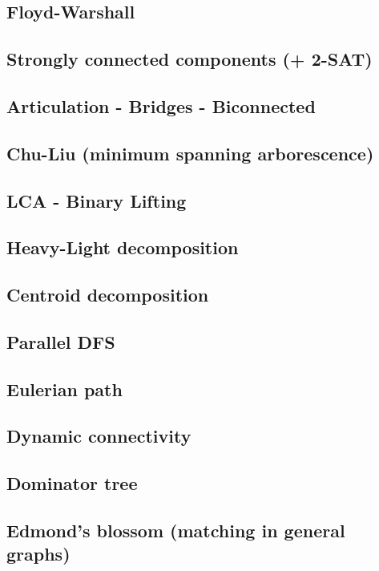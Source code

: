 \subsection{Floyd-Warshall}
\subsection{Strongly connected components (+ 2-SAT)}
\subsection{Articulation - Bridges - Biconnected}
\subsection{Chu-Liu (minimum spanning arborescence)}
\subsection{LCA - Binary Lifting}
\subsection{Heavy-Light decomposition}
\subsection{Centroid decomposition}
\subsection{Parallel DFS}
\subsection{Eulerian path}
\subsection{Dynamic connectivity}
\subsection{Dominator tree}
\subsection{Edmond's blossom (matching in general graphs)}

